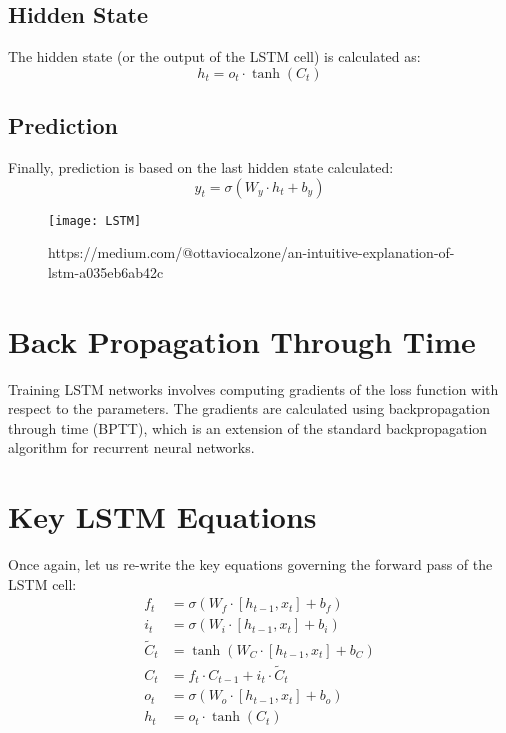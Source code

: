 \documentclass{article}
\begin{document}
\subsection{Hidden State}
The hidden state (or the output of the LSTM cell) is calculated as:
\begin{equation}
    h_t = o_t \cdot \tanh(C_t)
\end{equation}

\subsection{Prediction}
Finally, prediction is based on the last hidden state calculated: 
\begin{equation}
	y_t  = \sigma (W_y \cdot h_t + b_y)
\end{equation}

\begin{figure}[h]
	\centering
	\texttt{[image: LSTM]}
	\caption{https://medium.com/@ottaviocalzone/an-intuitive-explanation-of-lstm-a035eb6ab42c}
\end{figure}


\section{Back Propagation Through Time}
Training LSTM networks involves computing gradients of the loss function with respect to the parameters. The gradients are calculated using backpropagation through time (BPTT), which is an extension of the standard backpropagation algorithm for recurrent neural networks.

\section{Key LSTM Equations}
Once again, let us re-write the key equations governing the forward pass of the LSTM cell:
\begin{align}
	f_t &= \sigma(W_f \cdot [h_{t-1}, x_t] + b_f) \\
	i_t &= \sigma(W_i \cdot [h_{t-1}, x_t] + b_i) \\
	\tilde{C}_t &= \tanh(W_C \cdot [h_{t-1}, x_t] + b_C) \\
	C_t &= f_t \cdot C_{t-1} + i_t \cdot \tilde{C}_t \\
	o_t &= \sigma(W_o \cdot [h_{t-1}, x_t] + b_o) \\
	h_t &= o_t \cdot \tanh(C_t)
\end{align}
\end{document}
